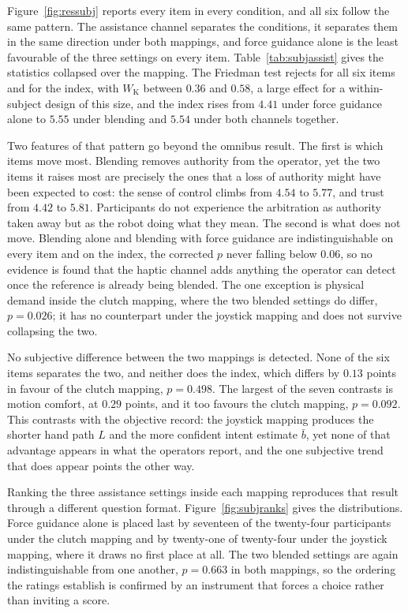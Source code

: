 Figure~\ref{fig:ressubj} reports every item in every condition, and all six follow the same pattern. The assistance channel separates the conditions, it separates them in the same direction under both mappings, and force guidance alone is the least favourable of the three settings on every item. Table~\ref{tab:subjassist} gives the statistics collapsed over the mapping. The Friedman test rejects for all six items and for the index, with $W_{\mathrm{K}}$ between $0.36$ and $0.58$, a large effect for a within-subject design of this size, and the index rises from $4.41$ under force guidance alone to $5.55$ under blending and $5.54$ under both channels together.

Two features of that pattern go beyond the omnibus result. The first is which items move most. Blending removes authority from the operator, yet the two items it raises most are precisely the ones that a loss of authority might have been expected to cost: the sense of control climbs from $4.54$ to $5.77$, and trust from $4.42$ to $5.81$. Participants do not experience the arbitration as authority taken away but as the robot doing what they mean. The second is what does not move. Blending alone and blending with force guidance are indistinguishable on every item and on the index, the corrected $p$ never falling below $0.06$, so no evidence is found that the haptic channel adds anything the operator can detect once the reference is already being blended. The one exception is physical demand inside the clutch mapping, where the two blended settings do differ, $p = 0.026$; it has no counterpart under the joystick mapping and does not survive collapsing the two.

No subjective difference between the two mappings is detected. None of the six items separates the two, and neither does the index, which differs by $0.13$ points in favour of the clutch mapping, $p = 0.498$. The largest of the seven contrasts is motion comfort, at $0.29$ points, and it too favours the clutch mapping, $p = 0.092$. This contrasts with the objective record: the joystick mapping produces the shorter hand path $L$ and the more confident intent estimate $\bar{b}$, yet none of that advantage appears in what the operators report, and the one subjective trend that does appear points the other way.



Ranking the three assistance settings inside each mapping reproduces that result through a different question format. Figure~\ref{fig:subjranks} gives the distributions. Force guidance alone is placed last by seventeen of the twenty-four participants under the clutch mapping and by twenty-one of twenty-four under the joystick mapping, where it draws no first place at all. The two blended settings are again indistinguishable from one another, $p = 0.663$ in both mappings, so the ordering the ratings establish is confirmed by an instrument that forces a choice rather than inviting a score.

